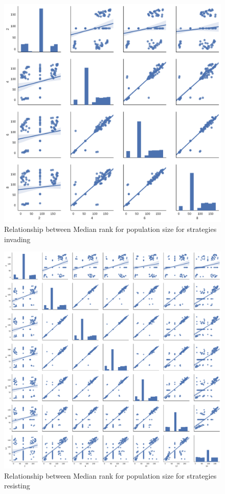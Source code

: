 \documentclass{article}
\begin{document}
\begin{figure}[!hbtp]
    \centering
    \includegraphics[width=\textwidth]{../img/relationship_between_median_ranks_invasion.pdf}
    \caption{Relationship between Median rank for population size for strategies
    invading}
    \label{fig:relationship_ranks_v_size_invasion}
\end{figure}

\begin{figure}[!hbtp]
    \centering
    \includegraphics[width=\textwidth]{../img/relationship_between_median_ranks_resistance.pdf}
    \caption{Relationship between Median rank for population size for strategies
    resisting}
    \label{fig:relationship_ranks_v_size_resistance}
\end{figure}
\end{document}
